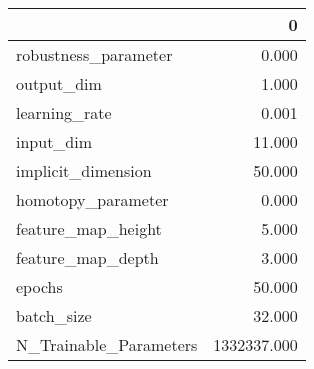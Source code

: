 \begin{tabular}{lr}
\toprule
{} &            0 \\
\midrule
robustness\_parameter   &        0.000 \\
output\_dim             &        1.000 \\
learning\_rate          &        0.001 \\
input\_dim              &       11.000 \\
implicit\_dimension     &       50.000 \\
homotopy\_parameter     &        0.000 \\
feature\_map\_height     &        5.000 \\
feature\_map\_depth      &        3.000 \\
epochs                 &       50.000 \\
batch\_size             &       32.000 \\
N\_Trainable\_Parameters &  1332337.000 \\
\bottomrule
\end{tabular}
